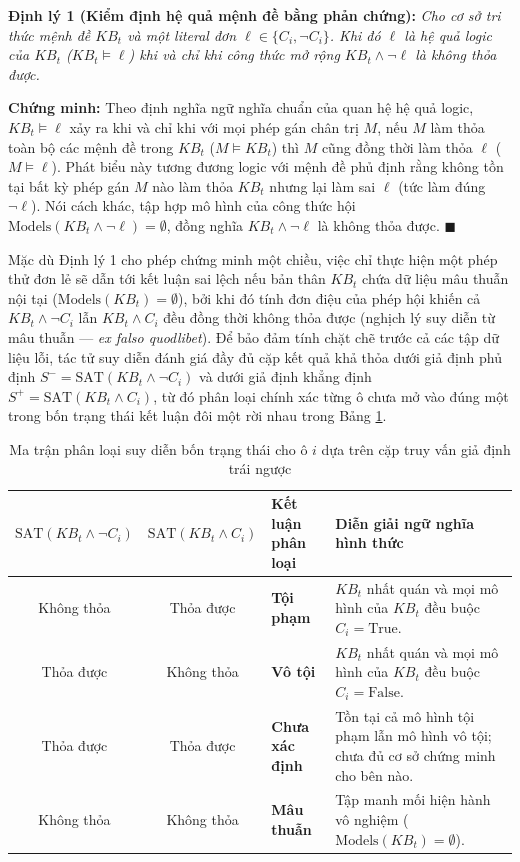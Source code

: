 \noindent\textbf{Định lý 1 (Kiểm định hệ quả mệnh đề bằng phản chứng):}
\textit{Cho cơ sở tri thức mệnh đề $KB_t$ và một literal đơn
$\ell \in \{C_i, \neg C_i\}$. Khi đó $\ell$ là hệ quả logic của $KB_t$
($KB_t \models \ell$) khi và chỉ khi công thức mở rộng $KB_t \wedge \neg \ell$ là
không thỏa được.}

\noindent\textbf{Chứng minh:}
Theo định nghĩa ngữ nghĩa chuẩn của quan hệ hệ quả logic, $KB_t \models \ell$ xảy
ra khi và chỉ khi với mọi phép gán chân trị $M$, nếu $M$ làm thỏa toàn bộ các mệnh
đề trong $KB_t$ ($M \models KB_t$) thì $M$ cũng đồng thời làm thỏa $\ell$
($M \models \ell$). Phát biểu này tương đương logic với mệnh đề phủ định rằng
không tồn tại bất kỳ phép gán $M$ nào làm thỏa $KB_t$ nhưng lại làm sai $\ell$
(tức làm đúng $\neg \ell$). Nói cách khác, tập hợp mô hình của công thức hội
$\mathrm{Models}(KB_t \wedge \neg \ell) = \emptyset$, đồng nghĩa
$KB_t \wedge \neg \ell$ là không thỏa được. $\blacksquare$

Mặc dù Định lý 1 cho phép chứng minh một chiều, việc chỉ thực hiện một phép thử
đơn lẻ sẽ dẫn tới kết luận sai lệch nếu bản thân $KB_t$ chứa dữ liệu mâu thuẫn nội
tại ($\mathrm{Models}(KB_t) = \emptyset$), bởi khi đó tính đơn điệu của phép hội
khiến cả $KB_t \wedge \neg C_i$ lẫn $KB_t \wedge C_i$ đều đồng thời không thỏa
được (nghịch lý suy diễn từ mâu thuẫn --- \textit{ex falso quodlibet}). Để bảo đảm
tính chặt chẽ trước cả các tập dữ liệu lỗi, tác tử suy diễn đánh giá đầy đủ cặp
kết quả khả thỏa dưới giả định phủ định $S^- = \mathrm{SAT}(KB_t \wedge \neg C_i)$
và dưới giả định khẳng định $S^+ = \mathrm{SAT}(KB_t \wedge C_i)$, từ đó phân loại
chính xác từng ô chưa mở vào đúng một trong bốn trạng thái kết luận đôi một rời
nhau trong Bảng \ref{tab:entailment_truth_table}.

\begin{table}[H]
\centering
\caption{%
    Ma trận phân loại suy diễn bốn trạng thái cho ô $i$ dựa trên cặp truy vấn giả
    định trái ngược}
\label{tab:entailment_truth_table}
\footnotesize
\setlength{\tabcolsep}{5pt}
\begin{tabularx}{\textwidth}{c c l >{\raggedright\arraybackslash}X}
\toprule
$\mathrm{SAT}(KB_t \wedge \neg C_i)$ & $\mathrm{SAT}(KB_t \wedge C_i)$ &
\textbf{Kết luận phân loại} & \textbf{Diễn giải ngữ nghĩa hình thức} \\
\midrule
Không thỏa & Thỏa được & \textbf{Tội phạm} & $KB_t$ nhất quán và mọi mô hình của
$KB_t$ đều buộc $C_i = \text{True}$. \\
Thỏa được & Không thỏa & \textbf{Vô tội} & $KB_t$ nhất quán và mọi mô hình của
$KB_t$ đều buộc $C_i = \text{False}$. \\
Thỏa được & Thỏa được & \textbf{Chưa xác định} & Tồn tại cả mô hình tội phạm lẫn
mô hình vô tội; chưa đủ cơ sở chứng minh cho bên nào. \\
Không thỏa & Không thỏa & \textbf{Mâu thuẫn} & Tập manh mối hiện hành vô nghiệm
($\mathrm{Models}(KB_t) = \emptyset$). \\
\bottomrule
\end{tabularx}
\end{table}

